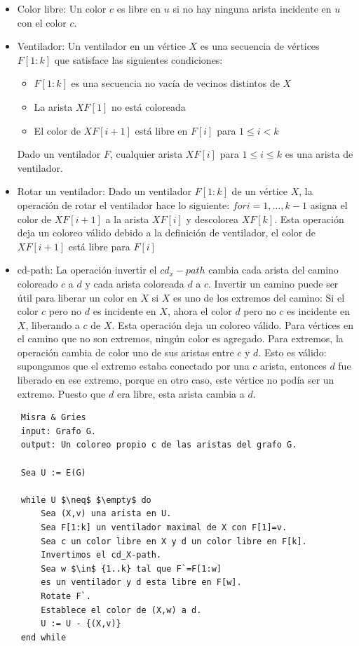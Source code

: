 \documentclass[a4paper]{article}
\begin{document}
\begin{itemize}
    \item Color libre: Un color $c$ es libre en $u$ si no hay ninguna arista incidente en $u$ con el color $c$.
    \item Ventilador: Un ventilador en un v\'ertice $X$ es una secuencia de v\'ertices $F[1:k]$ que satisface las siguientes condiciones:
        \begin{itemize}
            \item $F[1:k]$ es una secuencia no vac\'ia de vecinos distintos de $X$
            \item La arista $XF[1]$ no est\'a coloreada
            \item El color de $XF[i+1]$ est\'a libre en $F[i]$ para $1 \leq i < k$
        \end{itemize}
        Dado un ventilador $F$, cualquier arista $XF[i]$ para $1 \leq i \leq k$ es una arista de ventilador.
    \item Rotar un ventilador: Dado un ventilador $F[1:k]$ de un v\'ertice $X$, la operaci\'on de rotar el ventilador hace lo siguiente: $for i=1,...,k-1$ asigna el color de $XF[i+1]$ a la arista $XF[i]$ y descolorea $XF[k]$. Esta operaci\'on deja un coloreo v\'alido debido a la definici\'on de ventilador, el color de $XF[i+1]$ est\'a libre para $F[i]$
    \item cd-path: La operaci\'on invertir el $cd_x-path$ cambia cada arista del camino coloreado $c$ a $d$ y cada arista coloreada $d$ a $c$. Invertir un camino puede ser \'util para liberar un color en $X$ si $X$ es uno de los extremos del camino: Si el color $c$ pero no $d$ es incidente en $X$, ahora el color $d$ pero no $c$ es incidente en $X$, liberando a $c$ de $X$. Esta operaci\'on deja un coloreo v\'alido. Para v\'ertices en el camino que no son extremos, ning\'un color es agregado. Para extremos, la operaci\'on cambia de color uno de sus aristas entre $c$ y $d$. Esto es v\'alido: supongamos que el extremo estaba conectado por una $c$ arista, entonces $d$ fue liberado en ese extremo, porque en otro caso, este v\'ertice no pod\'ia ser un extremo. Puesto que $d$ era libre, esta arista cambia a $d$.
\end{itemize}

\begin{lstlisting}
    Misra & Gries 
    input: Grafo G.
    output: Un coloreo propio c de las aristas del grafo G.

    Sea U := E(G)

    while U $\neq$ $\empty$ do
        Sea (X,v) una arista en U.  
        Sea F[1:k] un ventilador maximal de X con F[1]=v.
        Sea c un color libre en X y d un color libre en F[k].  
        Invertimos el cd_X-path.  
        Sea w $\in$ {1..k} tal que F`=F[1:w]
        es un ventilador y d esta libre en F[w].  
        Rotate F`.
        Establece el color de (X,w) a d.
        U := U - {(X,v)}
    end while
\end{lstlisting}
\end{document}
